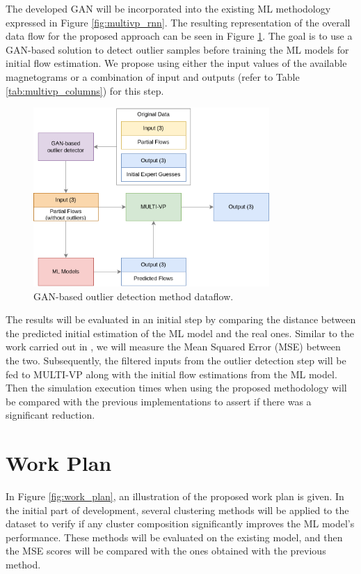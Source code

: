 The developed GAN will be incorporated into the existing ML methodology expressed in Figure \ref{fig:multivp_rnn}. The resulting representation of the overall data flow for the proposed approach can be seen in Figure \ref{fig:gan_rnn_multivp}. The goal is to use a GAN-based solution to detect outlier samples before training the ML models for initial flow estimation. We propose using either the input values of the available magnetograms or a combination of input and outputs (refer to Table \ref{tab:multivp_columns}) for this step.

\begin{figure}[ht]
\centering
\includegraphics[width=0.8\textwidth]{figures/gan_rnn_multivp.png}
\caption{GAN-based outlier detection method dataflow.}
\label{fig:gan_rnn_multivp}
\end{figure}

The results will be evaluated in an initial step by comparing the distance between the predicted initial estimation of the ML model and the real ones. Similar to the work carried out in \cite{barros_InitialConditionEstimation_}, we will measure the Mean Squared Error (MSE) between the two. Subsequently, the filtered inputs from the outlier detection step will be fed to MULTI-VP along with the initial flow estimations from the ML model. Then the simulation execution times when using the proposed methodology will be compared with the previous implementations to assert if there was a significant reduction.

\section{Work Plan}\label{sec:work_plan}
In Figure \ref{fig:work_plan}, an illustration of the proposed work plan is given. In the initial part of development, several clustering methods will be applied to the dataset to verify if any cluster composition significantly improves the ML model's performance. These methods will be evaluated on the existing model, and then the MSE scores will be compared with the ones obtained with the previous method.

